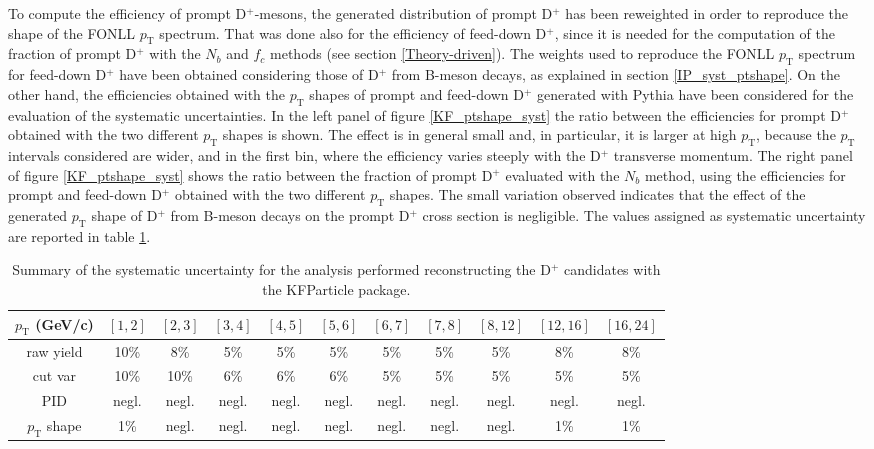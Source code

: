 \documentclass[b5paper,10pt,twoside,oldstyle,classica]{toptesi}
\newcommand{\pt}{p_\text{T}}
\begin{document}
To compute the efficiency of prompt D$^+$-mesons, the generated distribution of prompt D$^+$ has been reweighted in order to reproduce the shape of the FONLL $\pt$ spectrum. That was done also for the efficiency of feed-down D$^+$, since it is needed for the computation of the fraction of prompt D$^+$ with the $N_b$ and $f_c$ methods (see section \ref{Theory-driven}). The weights used to reproduce the FONLL $\pt$ spectrum for feed-down D$^+$ have been obtained considering those of D$^+$ from B-meson decays, as explained in section \ref{IP_syst_ptshape}. On the other hand, the efficiencies obtained with the $\pt$ shapes of prompt and feed-down D$^+$ generated with Pythia have been considered for the evaluation of the systematic uncertainties. In the left panel of figure \ref{KF_ptshape_syst} the ratio between the efficiencies for prompt D$^+$ obtained with the two different $\pt$ shapes is shown. The effect is in general small and, in particular, it is larger at high $\pt$, because the $\pt$ intervals considered are wider, and in the first bin, where the efficiency varies steeply with the D$^+$ transverse momentum. The right panel of figure \ref{KF_ptshape_syst} shows the ratio between the fraction of prompt D$^+$ evaluated with the $N_b$ method, using the efficiencies for prompt and feed-down D$^+$ obtained with the two different $\pt$ shapes. The small variation observed indicates that the effect of the generated $\pt$ shape of D$^+$ from B-meson decays on the prompt D$^+$ cross section is negligible. The values assigned as systematic uncertainty are reported in table \ref{KF_syst}.
\begin{table}[b]
\centering 
\begin{center} %
\renewcommand\arraystretch{1.5} 
\fontsize{7}{10}\selectfont
\begin{tabular}{|c|c|c|c|c|c|c|c|c|c|c|}
\hline
$\pt$ (GeV/c) & $[1,2]$ & $[2,3]$ & $[3,4]$ & $[4,5]$ & $[5,6]$ & $[6,7]$ & $[7,8]$ & $[8,12]$ & $[12,16]$ & $[16,24]$\\
\hline
raw yield & 10\% & 8\% & 5\% & 5\% & 5\% & 5\% & 5\% & 5\% & 8\% & 8\%\\
cut var & 10\% & 10\% & 6\% & 6\% & 6\% & 5\% & 5\% & 5\% & 5\% & 5\%\\
PID & negl. & negl. & negl. & negl. & negl. & negl. & negl. & negl. & negl. & negl.\\
$\pt$ shape & 1\% & negl. & negl. & negl. & negl. & negl. & negl. & negl. & 1\% & 1\%\\
\hline
\end{tabular}
\caption{Summary of the systematic uncertainty for the analysis performed reconstructing the D$^+$ candidates with the KFParticle package.}
\label{KF_syst}
\end{center} 
\end{table}
\end{document}
